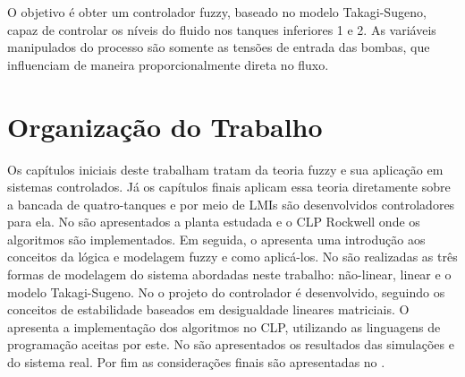 O objetivo é obter um controlador fuzzy, baseado no modelo Takagi-Sugeno, capaz de controlar os níveis do fluido nos tanques inferiores 1 e 2. As variáveis manipulados do processo são somente as tensões de entrada das bombas, que influenciam de maneira proporcionalmente direta no fluxo.

\section{Organização do Trabalho}
Os capítulos iniciais deste trabalham tratam da teoria fuzzy e sua aplicação em sistemas controlados. Já os capítulos finais aplicam essa teoria diretamente sobre a bancada de quatro-tanques e por meio de LMIs são desenvolvidos controladores para ela. No  são apresentados a planta estudada e o CLP Rockwell onde os algoritmos são implementados. Em seguida, o  apresenta uma introdução aos conceitos da lógica e modelagem fuzzy e como aplicá-los. No  são realizadas as três formas de modelagem do sistema abordadas neste trabalho: não-linear, linear e o modelo Takagi-Sugeno. No  o projeto do controlador é desenvolvido, seguindo os conceitos de estabilidade baseados em desigualdade lineares matriciais. O  apresenta a implementação dos algoritmos no CLP, utilizando as linguagens de programação aceitas por este. No  são apresentados os resultados das simulações e do sistema real. Por fim as considerações finais são apresentadas no .


%

